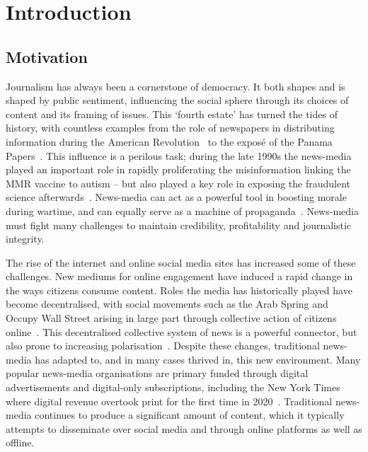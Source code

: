 \chapter{Introduction}\label{ch:introduction}

\section{Motivation}




Journalism has always been a cornerstone of democracy. It both shapes and is shaped by public sentiment, influencing the social sphere through its choices of content and its framing of issues. This `fourth estate' has turned the tides of history, with countless examples from the role of newspapers in distributing information during the American Revolution~\cite{tranFourthEstateFinal2016} to the exposé of the Panama Papers~\cite{odonovanValueOffshoreSecrets2019}. This influence is a perilous task; during the late 1990s the news-media played an important role in rapidly proliferating the misinformation linking the MMR vaccine to autism -- but also played a key role in exposing the fraudulent science afterwards~\cite{godleeWakefieldArticleLinking2011}. News-media can act as a powerful tool in boosting morale during wartime, and can equally serve as a machine of propaganda~\cite{jones2001censorship}. News-media must fight many challenges to maintain credibility, profitability and journalistic integrity. 


The rise of the internet and online social media sites has increased some of these challenges. New mediums for online engagement have induced a rapid change in the ways citizens consume content. Roles the media has historically played have become decentralised, with social movements such as the Arab Spring and Occupy Wall Street arising in large part through collective action of citizens online~\cite{skinnerSocialMediaRevolution2011}. This decentralised collective system of news is a powerful connector, but also prone to increasing polarisation~\cite{barberaTweetingLeftRight2015}. %
Despite these changes, traditional news-media has adapted to, and in many cases thrived in, this new environment. Many popular news-media organisations are primary funded through digital advertisements and digital-only subscriptions, including the New York Times where digital revenue overtook print for the first time in 2020~\cite{tracyNewYorkTimes2021}. Traditional news-media continues to produce a significant amount of content, which it typically attempts to disseminate over social media and through online platforms as well as offline.



